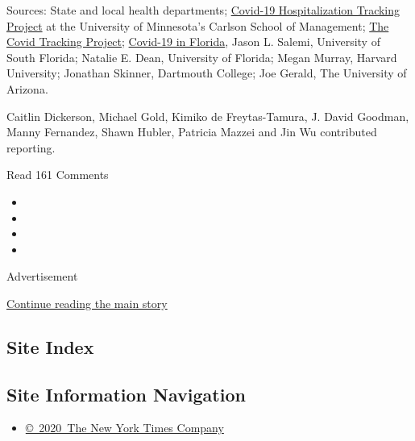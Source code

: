 Sources: State and local health departments;
\href{https://carlsonschool.umn.edu/mili-misrc-covid19-tracking-project}{Covid-19
Hospitalization Tracking Project} at the University of Minnesota's
Carlson School of Management; \href{https://covidtracking.com/}{The
Covid Tracking Project};
\href{https://public.tableau.com/profile/jason.salemi\#!/vizhome/COVID-19inFloridaanepidemiologiststake/StoryWeb}{Covid-19
in Florida}, Jason L. Salemi, University of South Florida; Natalie E.
Dean, University of Florida; Megan Murray, Harvard University; Jonathan
Skinner, Dartmouth College; Joe Gerald, The University of Arizona.

Caitlin Dickerson, Michael Gold, Kimiko de Freytas-Tamura, J. David
Goodman, Manny Fernandez, Shawn Hubler, Patricia Mazzei and Jin Wu
contributed reporting.

Read 161 Comments

\begin{itemize}
\item
\item
\item
\item
\end{itemize}

Advertisement

\protect\hyperlink{after-bottom}{Continue reading the main story}

\hypertarget{site-index}{%
\subsection{Site Index}\label{site-index}}

\hypertarget{site-information-navigation}{%
\subsection{Site Information
Navigation}\label{site-information-navigation}}

\begin{itemize}
\tightlist
\item
  \href{https://help.nytimes3xbfgragh.onion/hc/en-us/articles/115014792127-Copyright-notice}{©~2020~The
  New York Times Company}
\end{itemize}

